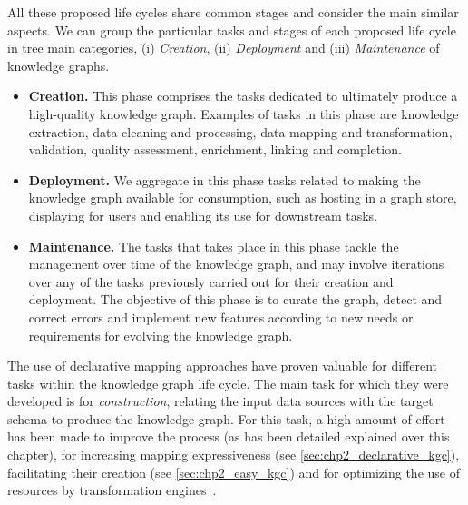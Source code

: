 All these proposed life cycles share common stages and consider the main similar aspects. We can group the particular tasks and stages of each proposed life cycle in tree main categories, (i) \textit{Creation}, (ii) \textit{Deployment} and (iii) \textit{Maintenance} of knowledge graphs. 
\begin{itemize}
    \item \textbf{Creation.} This phase comprises the tasks dedicated to ultimately produce a high-quality knowledge graph. Examples of tasks in this phase are knowledge extraction, data cleaning and processing, data mapping and transformation, validation, quality assessment, enrichment, linking and completion.

    \item \textbf{Deployment.} We aggregate in this phase tasks related to making the knowledge graph available for consumption, such as hosting in a graph store, displaying for users and enabling its use for downstream tasks. 

    \item \textbf{Maintenance.} The tasks that takes place in this phase tackle the management over time of the knowledge graph, and may involve iterations over any of the tasks previously carried out for their creation and deployment. The objective of this phase is to curate the graph, detect and correct errors and implement new features according to new needs or requirements for evolving the knowledge graph.
\end{itemize}

The use of declarative mapping approaches have proven valuable for different tasks within the knowledge graph life cycle. The main task for which they were developed is for \textit{construction}, relating the input data sources with the target schema to produce the knowledge graph. For this task, a high amount of effort has been made to improve the process (as has been detailed explained over this chapter), for increasing mapping expressiveness (see \cref{sec:chp2_declarative_kgc}), facilitating their creation (see \cref{sec:chp2_easy_kgc}) and for optimizing the use of resources by transformation engines~\parencite{arenas2022morphkgc,iglesias2023scaling,xiao2020virtual,iglesias2022empowering,jozashoori2019mapsdi}. 


